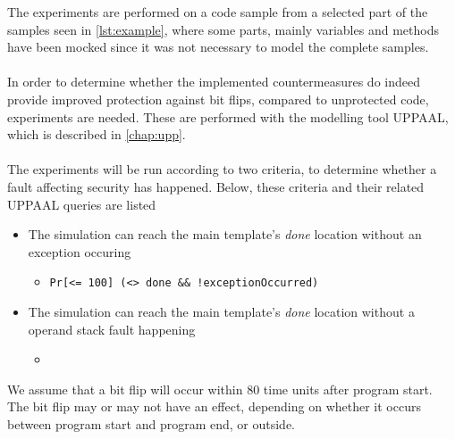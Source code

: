 The experiments are performed on a code sample from a selected part of the \jc samples seen in \cref{lst:example}, where some parts, mainly variables and methods have been mocked since it was not necessary to model the complete samples.\\\\
In order to determine whether the implemented countermeasures do indeed provide improved protection against bit flips, compared to unprotected code, experiments are needed. These are performed with the modelling tool UPPAAL, which is described in \cref{chap:upp}.\\\\
The experiments will be run according to two criteria, to determine whether a fault affecting security has happened. Below, these criteria and their related UPPAAL queries are listed

\begin{itemize}
\item The simulation can reach the main template's \textit{done} location without an exception occuring
	\begin{itemize}
	\item \texttt{Pr[<= 100] (<> done \&\& !exceptionOccurred)}
	\end{itemize}
\item The simulation can reach the main template's \textit{done} location without a operand stack fault happening
	\begin{itemize}
	\item
	\end{itemize}
\end{itemize}

We assume that a bit flip will occur within $80$ time units after program start. The bit flip may or may not have an effect, depending on whether it occurs between program start and program end, or outside.